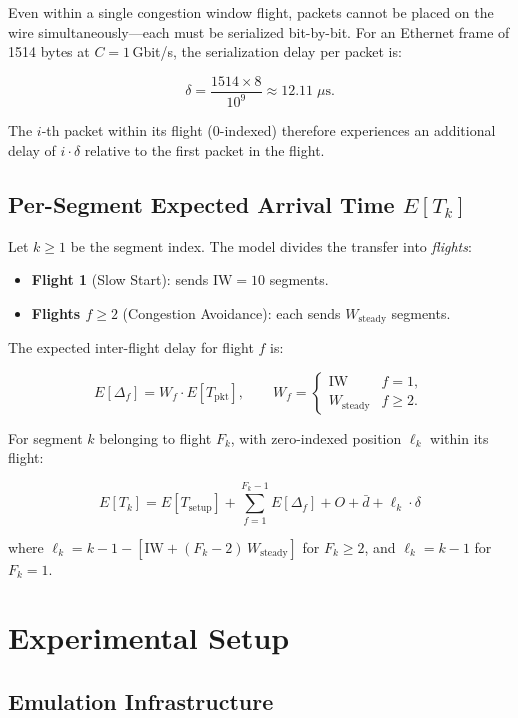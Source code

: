 \documentclass[11pt,letterpaper]{article}
\begin{document}
Even within a single congestion window flight, packets cannot be placed on the
wire simultaneously---each must be serialized bit-by-bit.  For an Ethernet frame
of 1514 bytes at $C = 1$\,Gbit/s, the serialization delay per packet is:

\[
\delta = \frac{1514 \times 8}{10^9} \approx 12.11\;\mu\text{s}.
\]

The $i$-th packet within its flight (0-indexed) therefore experiences an
additional delay of $i\cdot\delta$ relative to the first packet in the flight.

\subsection{Per-Segment Expected Arrival Time $E[T_k]$}

Let $k \geq 1$ be the segment index.  The model divides the transfer into
\emph{flights}:

\begin{itemize}
    \item \textbf{Flight 1} (Slow Start): sends $\mathrm{IW} = 10$ segments.
    \item \textbf{Flights $f \geq 2$} (Congestion Avoidance): each sends
          $W_{\mathrm{steady}}$ segments.
\end{itemize}

The expected inter-flight delay for flight $f$ is:

\[
E[\Delta_f] = W_f \cdot E[T_{\mathrm{pkt}}], \qquad
W_f =
\begin{cases}
\mathrm{IW} & f = 1, \\
W_{\mathrm{steady}} & f \geq 2.
\end{cases}
\]

For segment $k$ belonging to flight $F_k$, with zero-indexed position
$\ell_k$ within its flight:

\[
\boxed{
E[T_k] = E[T_{\mathrm{setup}}] + \sum_{f=1}^{F_k - 1} E[\Delta_f]
         + O + \bar{d} + \ell_k \cdot \delta
}
\]

where $\ell_k = k - 1 - \left[\mathrm{IW} + (F_k - 2)\,W_{\mathrm{steady}}\right]$
for $F_k \geq 2$, and $\ell_k = k - 1$ for $F_k = 1$.

\section{Experimental Setup}
\label{sec:setup}

\subsection{Emulation Infrastructure}
\end{document}
